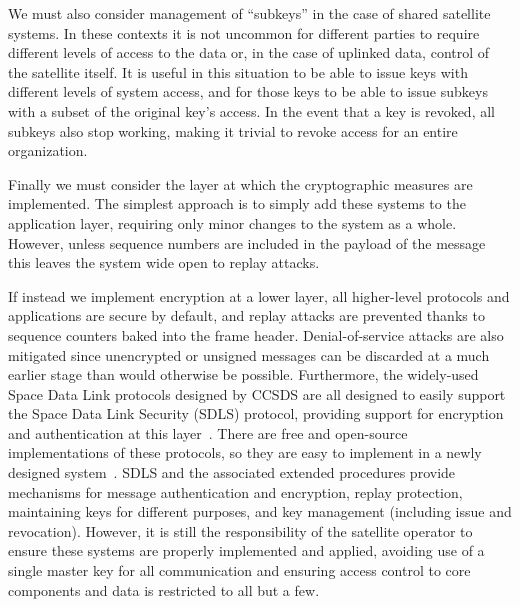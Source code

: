 We must also consider management of ``subkeys'' in the case of shared satellite systems.
In these contexts it is not uncommon for different parties to require different levels of access to the data or, in the case of uplinked data, control of the satellite itself.
It is useful in this situation to be able to issue keys with different levels of system access, and for those keys to be able to issue subkeys with a subset of the original key's access.
In the event that a key is revoked, all subkeys also stop working, making it trivial to revoke access for an entire organization.


Finally we must consider the layer at which the cryptographic measures are implemented.
The simplest approach is to simply add these systems to the application layer, requiring only minor changes to the system as a whole.
However, unless sequence numbers are included in the payload of the message this leaves the system wide open to replay attacks.

If instead we implement encryption at a lower layer, all higher-level protocols and applications are secure by default, and replay attacks are prevented thanks to sequence counters baked into the frame header.
Denial-of-service attacks are also mitigated since unencrypted or unsigned messages can be discarded at a much earlier stage than would otherwise be possible.
Furthermore, the widely-used Space Data Link protocols designed by CCSDS are all designed to easily support the Space Data Link Security (SDLS) protocol, providing support for encryption and authentication at this layer~\cite{ccsdsSpace2015,ccsdsSpace2020}.
There are free and open-source implementations of these protocols, so they are easy to implement in a newly designed system~\cite{nasaCryptolib}.
SDLS and the associated extended procedures provide mechanisms for message authentication and encryption, replay protection, maintaining keys for different purposes, and key management (including issue and revocation).
However, it is still the responsibility of the satellite operator to ensure these systems are properly implemented and applied, avoiding use of a single master key for all communication and ensuring access control to core components and data is restricted to all but a few.

